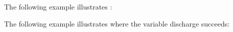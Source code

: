 The following example illustrates :\\

The following example illustrates  where
the variable discharge succeeds:\\

